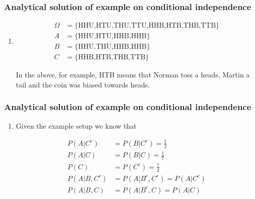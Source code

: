 \begin{frame}
    \frametitle{Analytical solution of example on conditional independence}

    \scriptsize
    \begin{enumerate}[a]

        \item
            \begin{align*}
                \Omega&=\{\text{HHU,HTU,THU,TTU,HHB,HTB,THB,TTB}\}\\
                A&=\{\text{HHU,HTU,HHB,HHB}\}\\
                B&=\{\text{HHU,THU,HHB,HHB}\}\\
                C&=\{\text{HHB,HTB,THB,TTB}\}
            \end{align*}

            In the above, for
            example, HTB means that Norman toss a heads, Martin a tail and the
            coin was biased towards heads.

            \seti
    \end{enumerate}
\end{frame}

\begin{frame}
    \frametitle{Analytical solution of example on conditional independence}

    \scriptsize
    \begin{enumerate}[a]
        \conti
        \item

            Given the example setup we know that

            \begin{align*}
                P(A|C^c)&=P(B|C^c)=\frac{1}{2}\\
                P(A|C)&=P(B|C)=\frac{1}{7}\\
                P(C)&=P(C^c)=\frac{1}{2}\\
                P(A|B,C^c)&=P(A|B^c,C^c)=P(A|C^c)\\
                P(A|B,C)&=P(A|B^c,C)=P(A|C)
            \end{align*}
            
    \end{enumerate}
    \normalsize

\end{frame}

